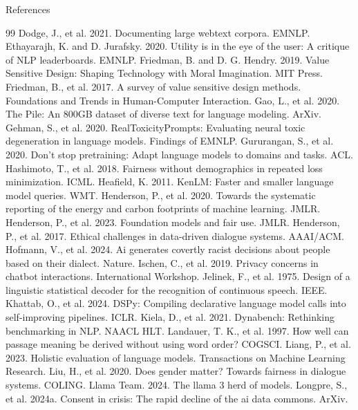\documentclass[aspectratio=169]{beamer}
\begin{document}
\begin{frame}[allowframebreaks]{References}
\begin{thebibliography}{99}
     Dodge, J., et al. 2021. Documenting large webtext corpora. EMNLP.
     Ethayarajh, K. and D. Jurafsky. 2020. Utility is in the eye of the user: A critique of NLP leaderboards. EMNLP.
     Friedman, B. and D. G. Hendry. 2019. Value Sensitive Design: Shaping Technology with Moral Imagination. MIT Press.
     Friedman, B., et al. 2017. A survey of value sensitive design methods. Foundations and Trends in Human-Computer Interaction.
     Gao, L., et al. 2020. The Pile: An 800GB dataset of diverse text for language modeling. ArXiv.
     Gehman, S., et al. 2020. RealToxicityPrompts: Evaluating neural toxic degeneration in language models. Findings of EMNLP.
     Gururangan, S., et al. 2020. Don’t stop pretraining: Adapt language models to domains and tasks. ACL.
     Hashimoto, T., et al. 2018. Fairness without demographics in repeated loss minimization. ICML.
     Heafield, K. 2011. KenLM: Faster and smaller language model queries. WMT.
     Henderson, P., et al. 2020. Towards the systematic reporting of the energy and carbon footprints of machine learning. JMLR.
     Henderson, P., et al. 2023. Foundation models and fair use. JMLR.
     Henderson, P., et al. 2017. Ethical challenges in data-driven dialogue systems. AAAI/ACM.
     Hofmann, V., et al. 2024. Ai generates covertly racist decisions about people based on their dialect. Nature.
     Ischen, C., et al. 2019. Privacy concerns in chatbot interactions. International Workshop.
     Jelinek, F., et al. 1975. Design of a linguistic statistical decoder for the recognition of continuous speech. IEEE.
     Khattab, O., et al. 2024. DSPy: Compiling declarative language model calls into self-improving pipelines. ICLR.
     Kiela, D., et al. 2021. Dynabench: Rethinking benchmarking in NLP. NAACL HLT.
     Landauer, T. K., et al. 1997. How well can passage meaning be derived without using word order? COGSCI.
     Liang, P., et al. 2023. Holistic evaluation of language models. Transactions on Machine Learning Research.
     Liu, H., et al. 2020. Does gender matter? Towards fairness in dialogue systems. COLING.
     Llama Team. 2024. The llama 3 herd of models.
     Longpre, S., et al. 2024a. Consent in crisis: The rapid decline of the ai data commons. ArXiv.

\end{thebibliography}
\end{frame}
\end{document}
